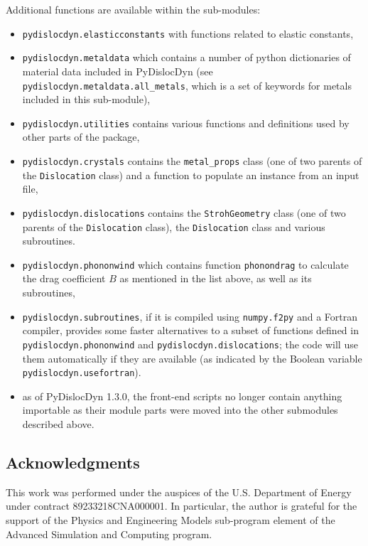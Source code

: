 \documentclass[11pt,letterpaper,oneside,pdftex]{article}
\begin{document}
Additional functions are available within the sub-modules:
\begin{itemize}
	\item \verb|pydislocdyn.elasticconstants| with functions related to elastic constants,
	\item \verb|pydislocdyn.metaldata| which contains a number of python dictionaries of material data included in PyDislocDyn (see \verb|pydislocdyn.metaldata.all_metals|, which is a set of keywords for metals included in this sub-module),
	\item \verb|pydislocdyn.utilities| contains various functions and definitions used by other parts of the package,
	\item \verb|pydislocdyn.crystals| contains the \verb|metal_props| class (one of two parents of the \verb|Dislocation| class) and a function to populate an instance from an input file,
	\item \verb|pydislocdyn.dislocations| contains the \verb|StrohGeometry| class (one of two parents of the \verb|Dislocation| class),  the \verb|Dislocation| class and various subroutines.
	\item \verb|pydislocdyn.phononwind| which contains function \verb|phonondrag| to calculate the drag coefficient $B$ as mentioned in the list above, as well as its subroutines,
	\item \verb|pydislocdyn.subroutines|, if it is compiled using \verb|numpy.f2py| and a Fortran compiler, provides some faster alternatives to a subset of functions defined in \verb|pydislocdyn.phononwind| and \verb|pydislocdyn.dislocations|; the code will use them automatically if they are available (as indicated by the Boolean variable \verb|pydislocdyn.usefortran|).
	\item as of PyDislocDyn 1.3.0, the front-end scripts no longer contain anything importable as their module parts were moved into the other submodules described above.
\end{itemize}


\subsection*{Acknowledgments}

This work was performed under the auspices of the U.S. Department of Energy under contract 89233218CNA000001.
In particular, the author is grateful for the support of the Physics and Engineering Models sub-program element of the Advanced Simulation and Computing program.


\printbibliography
\end{document}
